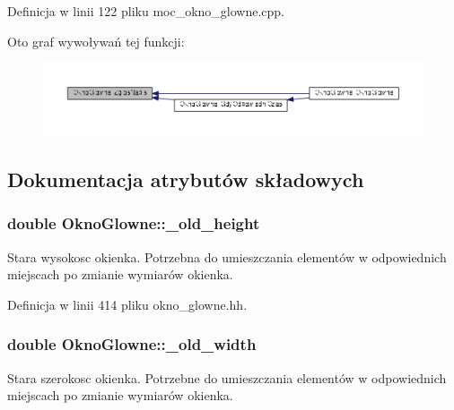 Definicja w linii 122 pliku moc\+\_\+okno\+\_\+glowne.\+cpp.



Oto graf wywoływań tej funkcji\+:\nopagebreak
\begin{figure}[H]
\begin{center}
\leavevmode
\includegraphics[width=350pt]{class_okno_glowne_aa602a0c5a940f0af4ab7390bfc1a4b9d_icgraph}
\end{center}
\end{figure}




\subsection{Dokumentacja atrybutów składowych}
\hypertarget{class_okno_glowne_a7dae1b25dbade179eb6dfc30ffeab14b}{}
\subsubsection[{\+\_\+old\+\_\+height}]{\setlength{\rightskip}{0pt plus 5cm}double Okno\+Glowne\+::\+\_\+old\+\_\+height\hspace{0.3cm}{\ttfamily [private]}}\label{class_okno_glowne_a7dae1b25dbade179eb6dfc30ffeab14b}
Stara wysokosc okienka. Potrzebna do umieszczania elementów w odpowiednich miejscach po zmianie wymiarów okienka. 

Definicja w linii 414 pliku okno\+\_\+glowne.\+hh.

\hypertarget{class_okno_glowne_a6a0922607c0970ecdfe8adec7a773c7f}{}
\subsubsection[{\+\_\+old\+\_\+width}]{\setlength{\rightskip}{0pt plus 5cm}double Okno\+Glowne\+::\+\_\+old\+\_\+width\hspace{0.3cm}{\ttfamily [private]}}\label{class_okno_glowne_a6a0922607c0970ecdfe8adec7a773c7f}
Stara szerokosc okienka. Potrzebne do umieszczania elementów w odpowiednich miejscach po zmianie wymiarów okienka. 

